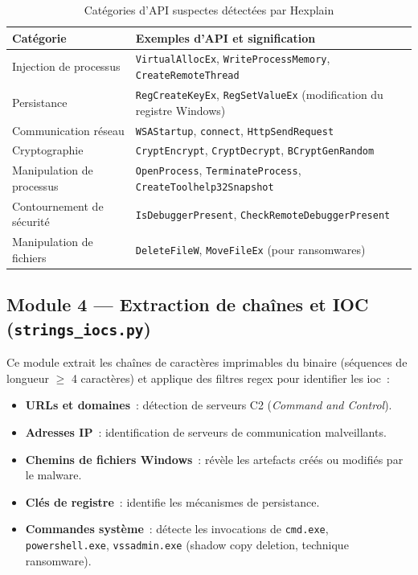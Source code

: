 \begin{table}[H]
  \centering
  \caption{Catégories d'API suspectes détectées par Hexplain}
  \label{tab:suspicious_apis}
  \begin{tabularx}{\textwidth}{l X}
    \toprule
    \textbf{Catégorie} & \textbf{Exemples d'API et signification} \\
    \midrule
    Injection de processus & \texttt{VirtualAllocEx}, \texttt{WriteProcessMemory}, \texttt{CreateRemoteThread} \\
    Persistance & \texttt{RegCreateKeyEx}, \texttt{RegSetValueEx} (modification du registre Windows) \\
    Communication réseau & \texttt{WSAStartup}, \texttt{connect}, \texttt{HttpSendRequest} \\
    Cryptographie & \texttt{CryptEncrypt}, \texttt{CryptDecrypt}, \texttt{BCryptGenRandom} \\
    Manipulation de processus & \texttt{OpenProcess}, \texttt{TerminateProcess}, \texttt{CreateToolhelp32Snapshot} \\
    Contournement de sécurité & \texttt{IsDebuggerPresent}, \texttt{CheckRemoteDebuggerPresent} \\
    Manipulation de fichiers & \texttt{DeleteFileW}, \texttt{MoveFileEx} (pour ransomwares) \\
    \bottomrule
  \end{tabularx}
\end{table}

\subsection{Module 4 --- Extraction de chaînes et IOC (\texttt{strings\_iocs.py})}

Ce module extrait les chaînes de caractères imprimables du binaire (séquences de longueur $\geq$ 4 caractères) et applique des filtres regex pour identifier les \acrfull{ioc}~:
\begin{itemize}
  \item \textbf{URLs et domaines}~: détection de serveurs C2 (\textit{Command and Control}).
  \item \textbf{Adresses IP}~: identification de serveurs de communication malveillants.
  \item \textbf{Chemins de fichiers Windows}~: révèle les artefacts créés ou modifiés par le malware.
  \item \textbf{Clés de registre}~: identifie les mécanismes de persistance.
  \item \textbf{Commandes système}~: détecte les invocations de \texttt{cmd.exe}, \texttt{powershell.exe}, \texttt{vssadmin.exe} (shadow copy deletion, technique ransomware).
\end{itemize}

